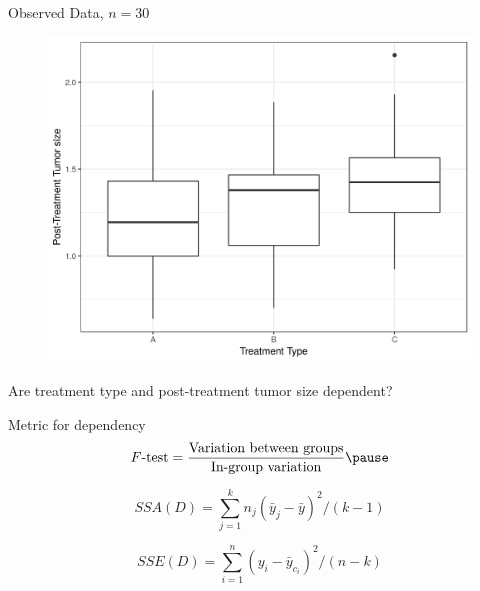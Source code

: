 \documentclass{beamer}
\newcommand{\sse}{\textit{SSE}\xspace}
\newcommand{\ssa}{\textit{SSA}\xspace}
\begin{document}
\begin{frame}{Observed Data, $n=30$}
\begin{figure}
  \includegraphics[scale=0.5]{simulation/observed-plot}
\end{figure}
\pause
Are treatment type and post-treatment tumor size dependent?
\end{frame}

\begin{frame}{Metric for dependency}
\pause
\begin{equation*}
F\text{-test} = \frac{\text{Variation between groups}}{\text{In-group variation}} \pause 
\end{equation*}

\begin{equation*}
\ssa(D) = \sum_{j=1}^{k} n_j (\bar{y}_j - \bar{y})^2/(k-1)
\end{equation*}

\begin{equation*}
\sse(D) = \sum_{i=1}^{n}  (y_{i}-\bar{y}_{c_i})^2/(n-k)
\end{equation*}
\end{frame}
\end{document}
